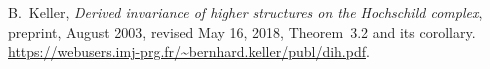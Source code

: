 B.~Keller, \emph{Derived invariance of higher structures on the Hochschild complex},
preprint, August 2003, revised May 16, 2018, Theorem~3.2 and its corollary.
\url{https://webusers.imj-prg.fr/~bernhard.keller/publ/dih.pdf}.
